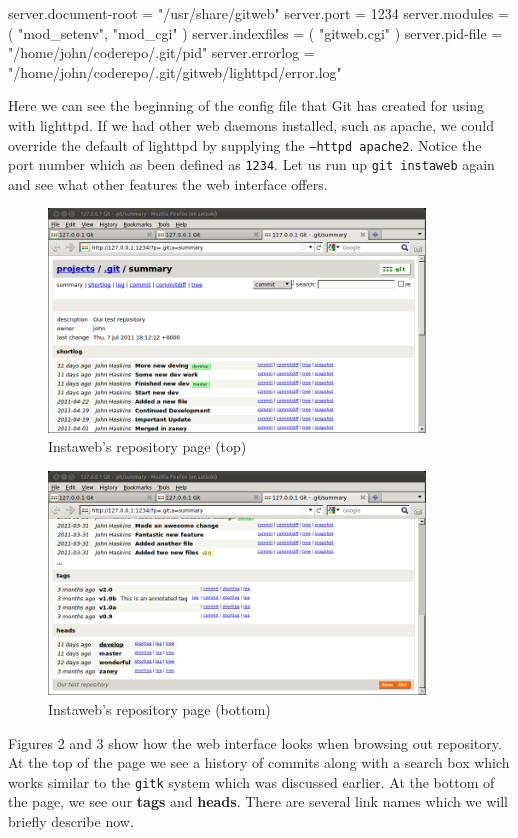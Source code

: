 \begin{code}
server.document-root = "/usr/share/gitweb"
server.port = 1234
server.modules = ( "mod_setenv", "mod_cgi" )
server.indexfiles = ( "gitweb.cgi" )
server.pid-file = "/home/john/coderepo/.git/pid"
server.errorlog = "/home/john/coderepo/.git/gitweb/lighttpd/error.log"
\end{code}

Here we can see the beginning of the config file that Git has created for using with lighttpd.
If we had other web daemons installed, such as apache, we could override the default of lighttpd by supplying the \texttt{--httpd apache2}.
Notice the port number which as been defined as \texttt{1234}.
Let us run up \texttt{git instaweb} again and see what other features the web interface offers.

\begin{figure}[hbt]
\centering
\includegraphics[width=10cm]{images/f-af7-d2.png}
\caption{Instaweb's repository page (top)}
\end{figure}

\begin{figure}[hbt]
\centering
\includegraphics[width=10cm]{images/f-af7-d3.png}
\caption{Instaweb's repository page (bottom)}
\end{figure}

Figures 2 and 3 show how the web interface looks when browsing out repository.
At the top of the page we see a history of commits along with a search box which works similar to the \texttt{gitk} system which was discussed earlier.
At the bottom of the page, we see our \textbf{tags} and \textbf{heads}.
There are several link names which we will briefly describe now.

